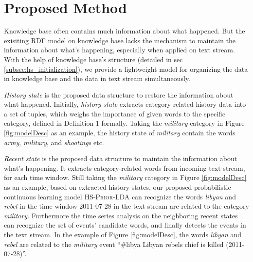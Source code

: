 \documentclass[conference,compsoc]{IEEEtran}
\begin{document}

\section{Proposed Method}
Knowledge base often contains much information about what happened. 
But the exisiting RDF model\cite{klyne2006rdf} on knowledge base lacks the mechanism to maintain the information about what's happening, especially when applied on text stream.  
With the help of knowledge base's structure (detailed in sec \ref{subsec:hs_initialization}), we provide a  lightweight model for organizing the data in knowledge base and the data in text stream simultaneously.

\textit{History state} is the proposed data structure to restore the information about what happened. 
Initially, \textit{history state} extracts category-related history data into a set of tuples, which weighs the importance of given words to the specific category, defined in Definition 1 formally. 
Taking the \textit{military} category in Figure \ref{fig:modelDesc} as an example, the history state of \textit{military} contain the words \textit{army}, \textit{military}, and \textit{shootings} etc. 

\textit{Recent state} is the proposed data structure to maintain the information about what's happening.
It extracts category-related words from incoming text stream, for each time window.
Still taking the \textit{military} category in  Figure \ref{fig:modelDesc} as an example, based on extracted history states, our proposed probabilistic continuous learning model \textsc{HS-Prior-LDA} can recognize the words \textit{libyan} and \textit{rebel} in the time window 2011-07-28 in the text stream are related to the category \textit{military}. 
Furthermore the time series analysis on the neighboring recent states can recognize the set of events' candidate words, and finally detects the events in the text stream. 
In the example of Figure \ref{fig:modelDesc}, the words \textit{libyan} and \textit{rebel} are related to the \textit{military} event ``\#libya Libyan rebels chief is killed (2011-07-28)''.
\end{document}
